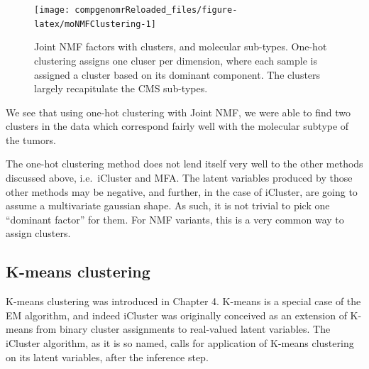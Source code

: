 \documentclass[12pt,]{krantz}
\begin{document}
\begin{figure}

{\centering \texttt{[image: compgenomrReloaded\_files/figure-latex/moNMFClustering-1]} 

}

\caption{Joint NMF factors with clusters, and molecular sub-types. One-hot clustering assigns one cluser per dimension, where each sample is assigned a cluster based on its dominant component. The clusters largely recapitulate the CMS sub-types.}\label{fig:moNMFClustering}
\end{figure}

We see that using one-hot clustering with Joint NMF, we were able to find two clusters in the data which correspond fairly well with the molecular subtype of the tumors.

The one-hot clustering method does not lend itself very well to the other methods discussed above, i.e.~iCluster and MFA. The latent variables produced by those other methods may be negative, and further, in the case of iCluster, are going to assume a multivariate gaussian shape. As such, it is not trivial to pick one ``dominant factor'' for them. For NMF variants, this is a very common way to assign clusters.

\hypertarget{k-means-clustering-1}{%
\subsection{K-means clustering}\label{k-means-clustering-1}}

K-means clustering was introduced in Chapter 4. K-means is a special case of the EM algorithm, and indeed iCluster was originally conceived as an extension of K-means from binary cluster assignments to real-valued latent variables. The iCluster algorithm, as it is so named, calls for application of K-means clustering on its latent variables, after the inference step.
\end{document}
